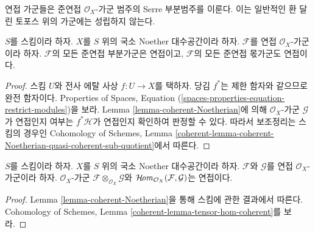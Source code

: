 \noindent
연접 가군들은 준연접 $\mathcal{O}_X$-가군 범주의 Serre 부분범주를
이룬다. 이는 일반적인 환 달린 토포스 위의 가군에는 성립하지 않는다.

\begin{lemma}
\label{lemma-coherent-Noetherian-quasi-coherent-sub-quotient}
$S$를 스킴이라 하자. $X$를 $S$ 위의 국소 Noether 대수공간이라
하자. $\mathcal{F}$를 연접 $\mathcal{O}_X$-가군이라 하자.
$\mathcal{F}$의 모든 준연접 부분가군은 연접이고,
$\mathcal{F}$의 모든 준연접 몫가군도 연접이다.
\end{lemma}

\begin{proof}
스킴 $U$와 전사 에탈 사상 $f : U \to X$를 택하자. 당김 $f^*$는
제한 함자와 같으므로 완전 함자이다. Properties of Spaces, Equation
(\ref{spaces-properties-equation-restrict-modules})을 보라. Lemma
\ref{lemma-coherent-Noetherian}에 의해 $\mathcal{O}_X$-가군
$\mathcal{G}$가 연접인지 여부는
$f^*\mathcal{H}$가 연접인지 확인하여 판정할 수 있다. 따라서
보조정리는 스킴의 경우인 Cohomology of Schemes, Lemma
\ref{coherent-lemma-coherent-Noetherian-quasi-coherent-sub-quotient}에서
따른다.
\end{proof}

\begin{lemma}
\label{lemma-tensor-hom-coherent}
$S$를 스킴이라 하자.
$X$를 $S$ 위의 국소 Noether 대수공간이라 하자.
$\mathcal{F}$와 $\mathcal{G}$를 연접 $\mathcal{O}_X$-가군이라 하자.
$\mathcal{O}_X$-가군
$\mathcal{F} \otimes_{\mathcal{O}_X} \mathcal{G}$와
$\mathop{\mathcal{H}\!\mathit{om}}\nolimits_{\mathcal{O}_X}(\mathcal{F}, \mathcal{G})$는 연접이다.
\end{lemma}

\begin{proof}
Lemma \ref{lemma-coherent-Noetherian}을 통해 스킴에 관한 결과에서
따른다. Cohomology of Schemes, Lemma
\ref{coherent-lemma-tensor-hom-coherent}를 보라.
\end{proof}

